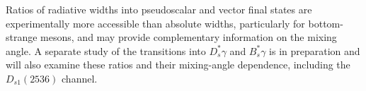 
Ratios of radiative widths into pseudoscalar and vector final states are
experimentally more accessible than absolute widths, particularly for
bottom-strange mesons, and may provide complementary information on the
mixing angle. A separate study of the transitions into $D_s^*\gamma$ and
$B_s^*\gamma$ is in preparation and will also examine these ratios and
their mixing-angle dependence, including the $D_{s1}(2536)$ channel.
